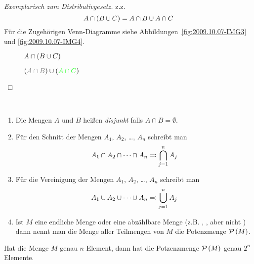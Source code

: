 \begin{proof}[Exemplarisch zum Distributivgesetz]
\ac{z.z.}
\[A \cap \left(B \cup C\right) = A \cap B \cup A \cap C\]
Für die Zugehörigen Venn-Diagramme siehe Abbildungen~\vref{fig:2009.10.07-IMG3} und \vref{fig:2009.10.07-IMG4}.
\begin{figure}[htb]
\centering

\caption{$A \cap \left(B \cup C\right)$}
\label{fig:2009.10.07-IMG3}
\end{figure}

\begin{figure}[htb]
\centering

\caption{\textcolor{blue}{$\rk{\textcolor{gray}{A \cap B}} \cup \rk{\textcolor{green}{A \cap C}}$}}
\label{fig:2009.10.07-IMG4}
\end{figure}
\end{proof}

\begin{definition}~
\begin{enumerate}
\item Die Mengen $A$ und $B$ heißen \emph{disjunkt} falls $A \cap B = \emptyset$.
\item Für den Schnitt der Mengen $A_1$, $A_2$, \dots, $A_n$ schreibt man \[A_1 \cap A_2 \cap \dots \cap A_n \mathrel{=\!\!\mathop:} \bigcap_{j = 1}^{n} A_j\]
\item Für die Vereinigung der Mengen $A_1$, $A_2$, \dots, $A_n$ schreibt man \[A_1 \cup A_2 \cup \dots \cup A_n \mathrel{=\!\!\mathop:} \bigcup_{j = 1}^{n} A_j\]
\item Ist $M$ eine endliche Menge oder eine abzählbare Menge (\ac{z.B.} \N, \Z, \Q aber nicht \R) dann nennt man die Menge aller Teilmengen von $M$ die Potenzmenge $\mathcal{P}\left(M\right)$.
\end{enumerate}
\end{definition}

\begin{note}
Hat die Menge $M$ genau $n$ Element, dann hat die Potzenzmenge $\mathcal{P}\left(M\right)$ genau $2^n$ Elemente.
\end{note}
